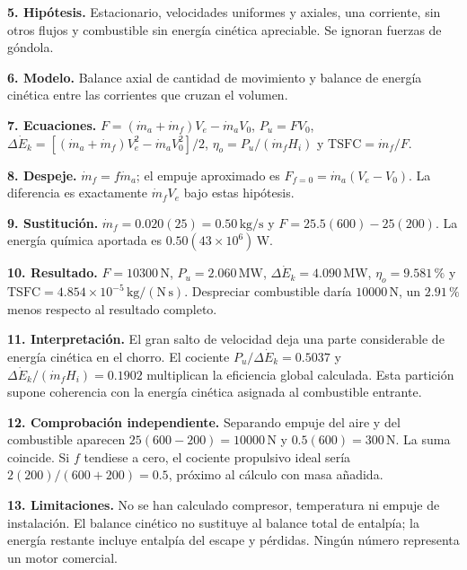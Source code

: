 \textbf{5. Hipótesis.} Estacionario, velocidades uniformes y axiales, una corriente, sin otros flujos y combustible sin energía cinética apreciable. Se ignoran fuerzas de góndola.

\textbf{6. Modelo.} Balance axial de cantidad de movimiento y balance de energía cinética entre las corrientes que cruzan el volumen.

\textbf{7. Ecuaciones.} $F=(\dot m_a+\dot m_f)V_e-\dot m_aV_0$, $P_u=FV_0$, $\Delta\dot E_k=[(\dot m_a+\dot m_f)V_e^2-\dot m_aV_0^2]/2$, $\eta_o=P_u/(\dot m_fH_i)$ y $\mathrm{TSFC}=\dot m_f/F$.

\textbf{8. Despeje.} $\dot m_f=f\dot m_a$; el empuje aproximado es $F_{f=0}=\dot m_a(V_e-V_0)$. La diferencia es exactamente $\dot m_fV_e$ bajo estas hipótesis.

\textbf{9. Sustitución.} $\dot m_f=0.020(25)=0.50\,\mathrm{kg/s}$ y $F=25.5(600)-25(200)$. La energía química aportada es $0.50(43\times10^6)\,\mathrm{W}$.

\textbf{10. Resultado.} $F=10300\,\mathrm{N}$, $P_u=2.060\,\mathrm{MW}$, $\Delta\dot E_k=4.090\,\mathrm{MW}$, $\eta_o=9.581\,\text{\%}$ y $\mathrm{TSFC}=4.854\times10^{-5}\,\mathrm{kg/(N\,s)}$. Despreciar combustible daría $10000\,\mathrm{N}$, un $2.91\,\text{\%}$ menos respecto al resultado completo.

\textbf{11. Interpretación.} El gran salto de velocidad deja una parte considerable de energía cinética en el chorro. El cociente $P_u/\Delta\dot E_k=0.5037$ y $\Delta\dot E_k/(\dot m_fH_i)=0.1902$ multiplican la eficiencia global calculada. Esta partición supone coherencia con la energía cinética asignada al combustible entrante.

\textbf{12. Comprobación independiente.} Separando empuje del aire y del combustible aparecen $25(600-200)=10000\,\mathrm{N}$ y $0.5(600)=300\,\mathrm{N}$. La suma coincide. Si $f$ tendiese a cero, el cociente propulsivo ideal sería $2(200)/(600+200)=0.5$, próximo al cálculo con masa añadida.

\textbf{13. Limitaciones.} No se han calculado compresor, temperatura ni empuje de instalación. El balance cinético no sustituye al balance total de entalpía; la energía restante incluye entalpía del escape y pérdidas. Ningún número representa un motor comercial.

